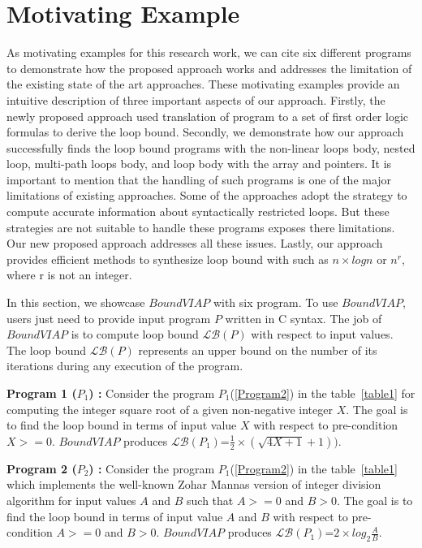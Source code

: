\documentclass{article}
\begin{document}
\section{Motivating Example}\label{examples}
As motivating examples for this research work, we can cite six different programs to demonstrate how the proposed approach works and addresses the limitation of the existing state of the art approaches. These motivating examples provide an intuitive description of three important aspects of our approach. Firstly, the newly proposed approach used translation of program to a set of first order logic formulas to derive the loop bound. Secondly, we demonstrate how our approach successfully finds the loop bound programs with the non-linear loops body, nested loop, multi-path loops body, and loop body with the array and pointers. It is important to mention that the handling of such programs is one of the major limitations of existing approaches. Some of the approaches adopt the strategy to compute accurate information about syntactically restricted loops. But these strategies are not suitable to handle these programs exposes there limitations. Our new proposed approach addresses all these issues. Lastly, our approach provides efficient methods to synthesize loop bound with such as $n \times log n$ or $n^r$, where r is not an integer.



In this section, we showcase $BoundVIAP$ with six program. To use $BoundVIAP$, users just need to provide input program $P$ written in C syntax. The job of $BoundVIAP$ is to compute loop bound $\mathcal{LB}(P)$ with respect to input values. The loop bound $\mathcal{LB}(P)$ represents an upper bound on the number of its iterations during any execution of the
program.

\textbf{Program 1 ($P_1$) : } Consider the program $P_1$(\ref{Program2}) in the table~\ref{table1} for computing the integer square root of a given non-negative integer $X$. The goal is to find the loop bound in terms of input value $X$ with respect to pre-condition $X>=0$. $BoundVIAP$ produces $\mathcal{LB}(P_1)$=$\frac{1}{2}\times(\sqrt{4X+1}+1))$.

\textbf{Program 2 ($P_2$) : } Consider the program $P_1$(\ref{Program2}) in the table~\ref{table1}
which implements the well-known Zohar Mannas version of integer division algorithm for input values $A$ and $B$ such that $A>=0$ and $B>0$. The goal is to find the loop bound in terms of input value $A$ and $B$ with respect to pre-condition $A>=0$ and $B>0$. $BoundVIAP$ produces $\mathcal{LB}(P_1)$=$2\times log_2\frac{A}{B}$.
\end{document}
